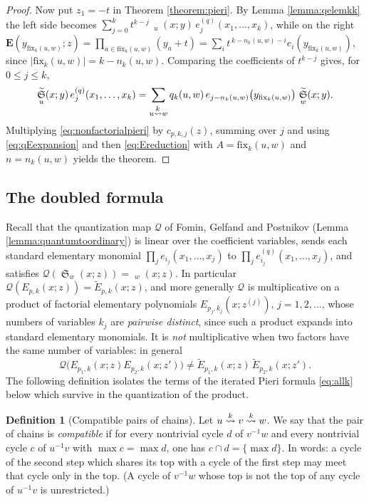 \documentclass{amsart}
\theoremstyle{definition}
\newtheorem{definition}[lemma]{Definition}
\theoremstyle{remark}
\numberwithin{equation}{section}
\DeclareMathOperator{\sch}{\mathfrak{S}}
\DeclareMathOperator{\qsch}{\widetilde{\mathfrak{S}}}
\newcommand{\xrightsquigarrow}[2][]{%
	\mathrel{\mathop{\rightsquigarrow}\limits^{\scriptstyle #2}%
	\ifx\hfuzz#1\hfuzz\else_{\scriptstyle #1}\fi}%
}
\newcommand{\tom}[1]{\ensuremath{\xrightsquigarrow{#1}}}
\newcommand{\fx}{\mathrm{fix}}
\newcommand{\wte}{\mathbf{E}}
\newcommand{\qelem}{\widetilde{E}}
\begin{document}
\begin{proof}
Now put $z_1=-t$ in Theorem \ref{theorem:pieri}. By Lemma \ref{lemma:qelemkk} the left side becomes $\sum_{j=0}^k t^{k-j}\,\qsch_u(x;y)\,e^{(q)}_j(x_1,\ldots,x_k)$, while on the right $\wte(y_{\fx_k(u,w)};z)=\prod_{a\in\fx_k(u,w)}(y_a+t)=\sum_i t^{\,k-n_k(u,w)-i}e_i(y_{\fx_k(u,w)})$, since $|\fx_k(u,w)|=k-n_k(u,w)$. Comparing the coefficients of $t^{k-j}$ gives, for $0\leq j\leq k$,
\begin{equation}\label{eq:nonfactorialpieri}
\qsch_u(x;y)\,e^{(q)}_j(x_1,\ldots,x_k)=\sum_{u\tom{k}w}q_k(u,w)\,e_{j-n_k(u,w)}\big(y_{\fx_k(u,w)}\big)\,\qsch_w(x;y).
\end{equation}
Multiplying \eqref{eq:nonfactorialpieri} by $c_{p,k,j}(z)$, summing over $j$ and using \eqref{eq:qEexpansion} and then \eqref{eq:Ereduction} with $A=\fx_k(u,w)$ and $n=n_k(u,w)$ yields the theorem.
\end{proof}

\subsection*{The doubled formula}

Recall that the quantization map $\mathcal Q$ of Fomin, Gelfand and Postnikov (Lemma \ref{lemma:quantumtoordinary}) is linear over the coefficient variables, sends each standard elementary monomial $\prod_j e_{i_j}(x_1,\ldots,x_j)$ to $\prod_j e^{(q)}_{i_j}(x_1,\ldots,x_j)$, and satisfies $\mathcal Q(\sch_w(x;z))=\qsch_w(x;z)$. In particular $\mathcal Q(E_{p,k}(x;z))=\qelem_{p,k}(x;z)$, and more generally $\mathcal Q$ is multiplicative on a product of factorial elementary polynomials $E_{p_j,k_j}(x;z^{(j)})$, $j=1,2,\ldots$, whose numbers of variables $k_j$ are \emph{pairwise distinct}, since such a product expands into standard elementary monomials. It is \emph{not} multiplicative when two factors have the same number of variables: in general$$\mathcal Q\big(E_{p_1,k}(x;z)E_{p_2,k}(x;z')\big)\neq\qelem_{p_1,k}(x;z)\,\qelem_{p_2,k}(x;z').$$ The following definition isolates the terms of the iterated Pieri formula \eqref{eq:allk} below which survive in the quantization of the product.

\begin{definition}[Compatible pairs of chains] \label{def:compatible}
Let $u\tom{k}v\tom{k}w$. We say that the pair of chains is \emph{compatible} if for every nontrivial cycle $d$ of $v^{-1}w$ and every nontrivial cycle $c$ of $u^{-1}v$ with $\max c=\max d$, one has $c\cap d=\{\max d\}$. In words: a cycle of the second step which shares its top with a cycle of the first step may meet that cycle only in the top. (A cycle of $v^{-1}w$ whose top is not the top of any cycle of $u^{-1}v$ is unrestricted.)
\end{definition}
\end{document}
